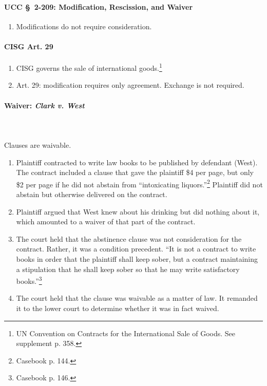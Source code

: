 \paragraph{UCC \S\ 2-209: Modification, Rescission, and Waiver}

\begin{enumerate}
    \item Modifications do not require consideration.
\end{enumerate}

\paragraph{CISG Art. 29}

\begin{enumerate}
    \item CISG governs the sale of international goods.\footnote{UN Convention on Contracts for the International Sale 
    of Goods. See supplement p. 358.} 
    \item Art. 29: modification requires only agreement. Exchange is not 
    required.
\end{enumerate}

\paragraph{Waiver: \emph{Clark v. West}}
~\\\\
Clauses are waivable.

\begin{enumerate}
    \item Plaintiff contracted to write law books to be published by defendant 
    (West). The contract included a clause that gave the plaintiff \$4 per 
    page, but only \$2 per page if he did not abstain from ``intoxicating 
    liquors.''\footnote{Casebook p. 144.} Plaintiff did not abstain but 
    otherwise delivered on the contract. 
    \item Plaintiff argued that West knew about his drinking but did nothing 
    about it, which amounted to a waiver of that part of the contract.
    \item The court held that the abstinence clause was not consideration for 
    the contract. Rather, it was a condition precedent. ``It is not a contract 
    to write books in order that the plaintiff shall keep sober, but a 
    contract maintaining a stipulation that he shall keep sober so that he may 
    write satisfactory books.''\footnote{Casebook p. 146.}
    \item The court held that the clause was waivable as a matter of law. It 
    remanded it to the lower court to determine whether it was in fact waived.
\end{enumerate}

